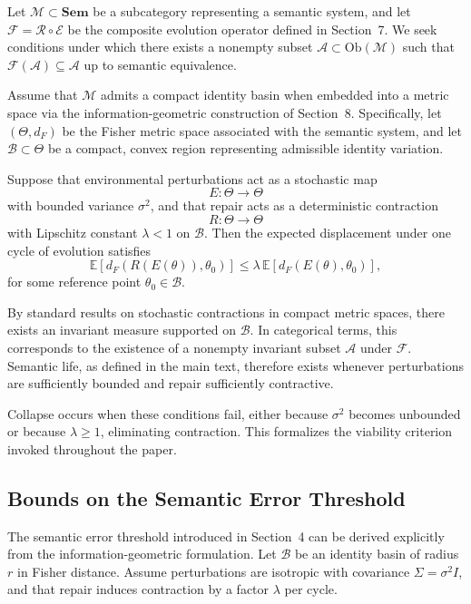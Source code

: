 \documentclass[11pt,oneside]{article}
\begin{document}
Let $\mathcal{M} \subset \mathbf{Sem}$ be a subcategory representing a semantic system, and let $\mathcal{F} = \mathcal{R} \circ \mathcal{E}$ be the composite evolution operator defined in Section~7. We seek conditions under which there exists a nonempty subset $\mathcal{A} \subset \mathrm{Ob}(\mathcal{M})$ such that $\mathcal{F}(\mathcal{A}) \subseteq \mathcal{A}$ up to semantic equivalence.

Assume that $\mathcal{M}$ admits a compact identity basin when embedded into a metric space via the information-geometric construction of Section~8. Specifically, let $(\Theta, d_F)$ be the Fisher metric space associated with the semantic system, and let $\mathcal{B} \subset \Theta$ be a compact, convex region representing admissible identity variation.

Suppose that environmental perturbations act as a stochastic map
\[
E : \Theta \rightarrow \Theta
\]
with bounded variance $\sigma^2$, and that repair acts as a deterministic contraction
\[
R : \Theta \rightarrow \Theta
\]
with Lipschitz constant $\lambda < 1$ on $\mathcal{B}$. Then the expected displacement under one cycle of evolution satisfies
\[
\mathbb{E}\!\left[d_F\!\left(R(E(\theta)), \theta_0\right)\right]
\le
\lambda \, \mathbb{E}\!\left[d_F\!\left(E(\theta), \theta_0\right)\right],
\]
for some reference point $\theta_0 \in \mathcal{B}$.

By standard results on stochastic contractions in compact metric spaces, there exists an invariant measure supported on $\mathcal{B}$. In categorical terms, this corresponds to the existence of a nonempty invariant subset $\mathcal{A}$ under $\mathcal{F}$. Semantic life, as defined in the main text, therefore exists whenever perturbations are sufficiently bounded and repair sufficiently contractive.

Collapse occurs when these conditions fail, either because $\sigma^2$ becomes unbounded or because $\lambda \ge 1$, eliminating contraction. This formalizes the viability criterion invoked throughout the paper.

\subsection{Bounds on the Semantic Error Threshold}

The semantic error threshold introduced in Section~4 can be derived explicitly from the information-geometric formulation. Let $\mathcal{B}$ be an identity basin of radius $r$ in Fisher distance. Assume perturbations are isotropic with covariance $\Sigma = \sigma^2 I$, and that repair induces contraction by a factor $\lambda$ per cycle.
\end{document}
